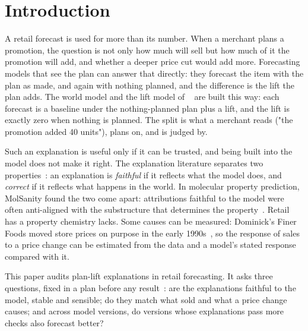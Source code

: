 \section{Introduction}
\label{sec:intro}

A retail forecast is used for more than its number. When a merchant plans a
promotion, the question is not only how much will sell but how much of it the
promotion will add, and whether a deeper price cut would add more. Forecasting
models that see the plan can answer that directly: they forecast the item with
the plan as made, and again with nothing planned, and the difference is the lift
the plan adds. The world model and the lift model of \ourcompanion{}
~\cite{rwm} are built this way: each forecast is a baseline under the
nothing-planned plan plus a lift, and the lift is exactly zero when nothing is
planned. The split is what a merchant reads ("the promotion added 40 units"),
plans on, and is judged by.

Such an explanation is useful only if it can be trusted, and being built into
the model does not make it right. The explanation literature separates two
properties~\cite{jacovi2020,chen2020}: an explanation is \emph{faithful} if it
reflects what the model does, and \emph{correct} if it reflects what happens in
the world. In molecular property prediction, MolSanity found the two come
apart: attributions faithful to the model were often anti-aligned with the
substructure that determines the property~\cite{molsanity}. Retail has a
property chemistry lacks. Some causes can be measured: Dominick's Finer Foods
moved store prices on purpose in the early 1990s~\cite{hoch1994}, so the
response of sales to a price change can be estimated from the data and a
model's stated response compared with it.

This paper audits plan-lift explanations in retail forecasting. It asks three
questions, fixed in a plan before any result~\cite{plan2}: are the
explanations faithful to the model, stable and sensible; do they match what
sold and what a price change causes; and across model versions, do versions
whose explanations pass more checks also forecast better?

